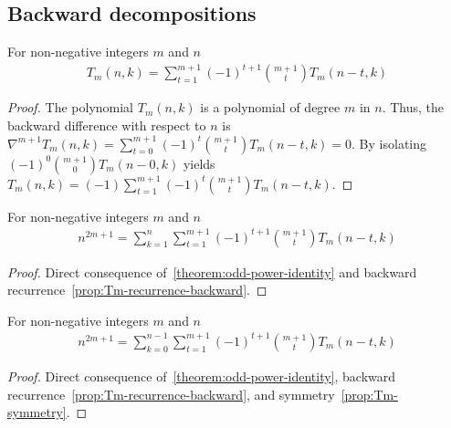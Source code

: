 \subsection{Backward decompositions}\label{subsec:backward-decompositions}
\begin{proposition}
    \label{prop:Tm-recurrence-backward}
    For non-negative integers $m$ and $n$
    \begin{align*}
        T_{m} (n, k) = \sum_{t=1}^{m+1} (-1)^{t+1} \binom{m+1}{t} T_{m} (n-t, k)
    \end{align*}
    \begin{proof}
        The polynomial $T_{m} (n,k)$ is a polynomial of degree $m$ in $n$.
        Thus, the backward difference with respect to $n$ is
        $\nabla^{m+1} T_{m} (n, k) = \sum_{t=0}^{m+1} (-1)^{t} \binom{m+1}{t} T_{m} (n-t, k) = 0$.
        By isolating $(-1)^{0} \binom{m+1}{0} T_{m} (n-0, k)$ yields
        $T_{m} (n, k) = (-1) \sum_{t=1}^{m+1} (-1)^{t} \binom{m+1}{t} T_{m} (n-t, k)$.
    \end{proof}
\end{proposition}

\begin{proposition}
    \label{prop:odd-power-decomposition-backward}
    For non-negative integers $m$ and $n$
    \begin{align*}
        n^{2m+1} = \sum_{k=1}^{n} \sum_{t=1}^{m+1} (-1)^{t+1} \binom{m+1}{t} T_{m} (n-t, k)
    \end{align*}
    \begin{proof}
        Direct consequence of~\eqref{theorem:odd-power-identity}
        and backward recurrence~\eqref{prop:Tm-recurrence-backward}.
    \end{proof}
\end{proposition}

\begin{proposition}
    \label{prop:odd-power-decomposition-backward-shifted}
    For non-negative integers $m$ and $n$
    \begin{align*}
        n^{2m+1} = \sum_{k=0}^{n-1} \sum_{t=1}^{m+1} (-1)^{t+1} \binom{m+1}{t} T_{m} (n-t, k)
    \end{align*}
    \begin{proof}
        Direct consequence of~\eqref{theorem:odd-power-identity},
        backward recurrence~\eqref{prop:Tm-recurrence-backward}, and symmetry~\eqref{prop:Tm-symmetry}.
    \end{proof}
\end{proposition}

